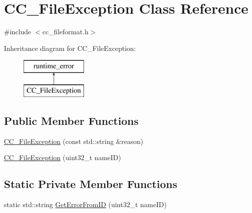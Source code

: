 \hypertarget{a00032}{\section{C\-C\-\_\-\-File\-Exception Class Reference}
\label{a00032}
}


{\ttfamily \#include $<$cc\-\_\-fileformat.\-h$>$}

Inheritance diagram for C\-C\-\_\-\-File\-Exception\-:\begin{figure}[H]
\begin{center}
\leavevmode
\includegraphics[height=2.000000cm]{a00032}
\end{center}
\end{figure}
\subsection*{Public Member Functions}
\begin{DoxyCompactItemize}
\item 
\hyperlink{a00032_abc5e91a9fd849864dcc3373a861fc90c}{C\-C\-\_\-\-File\-Exception} (const std\-::string \&reason)
\item 
\hyperlink{a00032_a93a9898ff8ffc0b3eb8b5ca9c9e2c02b}{C\-C\-\_\-\-File\-Exception} (uint32\-\_\-t name\-I\-D)
\end{DoxyCompactItemize}
\subsection*{Static Private Member Functions}
\begin{DoxyCompactItemize}
\item 
static std\-::string \hyperlink{a00032_a0acb55e721eb225c8076584a2e5f8dcd}{Get\-Error\-From\-I\-D} (uint32\-\_\-t name\-I\-D)
\end{DoxyCompactItemize}


